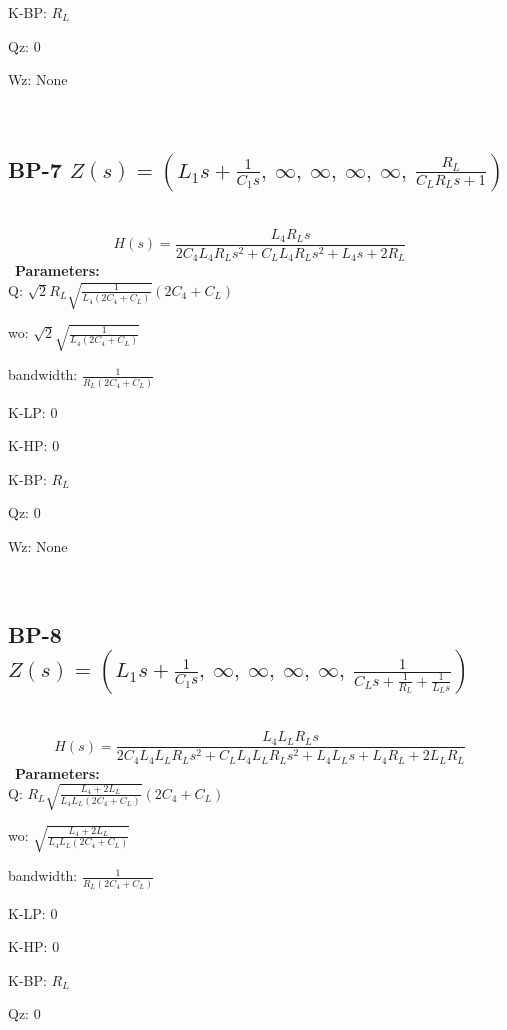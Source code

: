 \documentclass{article}
\begin{document}
K-BP: $R_{L}$\ 

Qz: $0$\ 

Wz: $\text{None}$\ 

\ 

\subsection{BP-7 $Z(s) = \left( L_{1} s + \frac{1}{C_{1} s}, \  \infty, \  \infty, \  \infty, \  \infty, \  \frac{R_{L}}{C_{L} R_{L} s + 1}\right)$ } \ 
\textbf{\[H(s) = \frac{L_{4} R_{L} s}{2 C_{4} L_{4} R_{L} s^{2} + C_{L} L_{4} R_{L} s^{2} + L_{4} s + 2 R_{L}}\] } \ 
\textbf{Parameters:}\\ 

Q: $\sqrt{2} R_{L} \sqrt{\frac{1}{L_{4} \left(2 C_{4} + C_{L}\right)}} \left(2 C_{4} + C_{L}\right)$\ 

wo: $\sqrt{2} \sqrt{\frac{1}{L_{4} \left(2 C_{4} + C_{L}\right)}}$\ 

bandwidth: $\frac{1}{R_{L} \left(2 C_{4} + C_{L}\right)}$\ 

K-LP: $0$\ 

K-HP: $0$\ 

K-BP: $R_{L}$\ 

Qz: $0$\ 

Wz: $\text{None}$\ 

\ 

\subsection{BP-8 $Z(s) = \left( L_{1} s + \frac{1}{C_{1} s}, \  \infty, \  \infty, \  \infty, \  \infty, \  \frac{1}{C_{L} s + \frac{1}{R_{L}} + \frac{1}{L_{L} s}}\right)$ } \ 
\textbf{\[H(s) = \frac{L_{4} L_{L} R_{L} s}{2 C_{4} L_{4} L_{L} R_{L} s^{2} + C_{L} L_{4} L_{L} R_{L} s^{2} + L_{4} L_{L} s + L_{4} R_{L} + 2 L_{L} R_{L}}\] } \ 
\textbf{Parameters:}\\ 

Q: $R_{L} \sqrt{\frac{L_{4} + 2 L_{L}}{L_{4} L_{L} \left(2 C_{4} + C_{L}\right)}} \left(2 C_{4} + C_{L}\right)$\ 

wo: $\sqrt{\frac{L_{4} + 2 L_{L}}{L_{4} L_{L} \left(2 C_{4} + C_{L}\right)}}$\ 

bandwidth: $\frac{1}{R_{L} \left(2 C_{4} + C_{L}\right)}$\ 

K-LP: $0$\ 

K-HP: $0$\ 

K-BP: $R_{L}$\ 

Qz: $0$\ 
\end{document}
